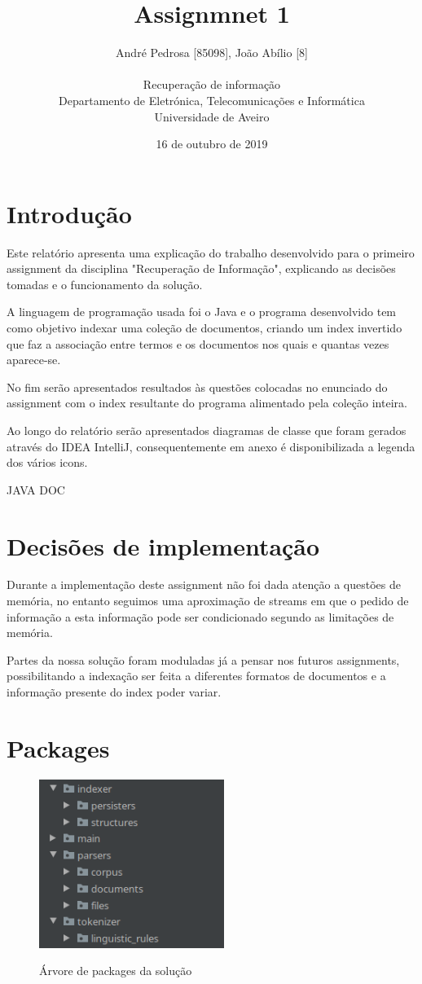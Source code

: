 \documentclass[12pt]{article}
\title{Assignmnet 1}
\author{
    André Pedrosa [85098], João Abílio [8]\\
    \\
    Recuperação de informação\\
    \normalsize{Departamento de Eletrónica, Telecomunicações e Informática}\\
    \normalsize{Universidade de Aveiro}\\
}
\date{16 de outubro de 2019}
\begin{document}
\baselineskip18pt

\maketitle

\section{Introdução}
Este relatório apresenta uma explicação do trabalho desenvolvido
para o primeiro assignment da disciplina "Recuperação de Informação",
explicando as decisões tomadas e o funcionamento da solução.

A linguagem de programação usada foi o Java e o programa desenvolvido
tem como objetivo indexar uma coleção de documentos, criando um index
invertido que faz a associação entre termos e os documentos nos quais e
quantas vezes aparece-se.

No fim serão apresentados resultados às questões colocadas no enunciado
do assignment com o index resultante do programa alimentado pela coleção inteira.

Ao longo do relatório serão apresentados diagramas de classe que foram gerados
através do IDEA IntelliJ, consequentemente em anexo é disponibilizada a
legenda dos vários icons.

JAVA DOC

\section{Decisões de implementação}
Durante a implementação deste assignment não foi dada atenção a questões de memória,
no entanto seguimos uma aproximação de streams em que o pedido de informação
a esta informação pode ser condicionado segundo as limitações de memória.

Partes da nossa solução foram moduladas já a pensar nos futuros assignments,
possibilitando a indexação ser feita a diferentes formatos de documentos e a informação
presente do index poder variar.

\section{Packages}

\begin{figure}[H]
  \center
  \includegraphics[width=6cm]{packages_all.png}
  \label{fig:packages_all}
  \caption{Árvore de packages da solução}
\end{figure}
\end{document}
